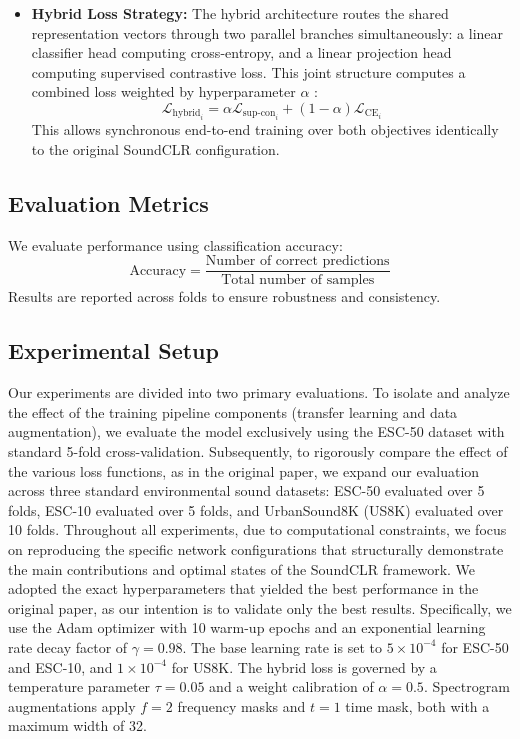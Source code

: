 \documentclass[twocolumn, 10pt]{article}
\begin{document}
\begin{itemize}
    \item \textbf{Hybrid Loss Strategy:} The hybrid architecture routes the shared representation vectors through two parallel branches simultaneously: a linear classifier head computing cross-entropy, and a linear projection head computing supervised contrastive loss. This joint structure computes a combined loss weighted by hyperparameter $\alpha$ \cite[Sec. III-C]{soundclr}:
    \begin{equation}
        \mathcal{L}_{\text{hybrid}_i} = \alpha \mathcal{L}_{\text{sup-con}_i} + (1 - \alpha) \mathcal{L}_{\text{CE}_i}
    \end{equation}
    This allows synchronous end-to-end training over both objectives identically to the original SoundCLR configuration.
\end{itemize}

\subsection{Evaluation Metrics}
We evaluate performance using classification accuracy:
\begin{equation}
\text{Accuracy} = \frac{\text{Number of correct predictions}}{\text{Total number of samples}}
\end{equation}
Results are reported across folds to ensure robustness and consistency.

\subsection{Experimental Setup}
Our experiments are divided into two primary evaluations. To isolate and analyze the effect of the training pipeline components (transfer learning and data augmentation), we evaluate the model exclusively using the ESC-50 dataset with standard 5-fold cross-validation. Subsequently, to rigorously compare the effect of the various loss functions, as in the original paper, we expand our evaluation across three standard environmental sound datasets: ESC-50 evaluated over 5 folds, ESC-10 evaluated over 5 folds, and UrbanSound8K (US8K) \cite{salamon2014dataset} evaluated over 10 folds. Throughout all experiments, due to computational constraints, we focus on reproducing the specific network configurations that structurally demonstrate the main contributions and optimal states of the SoundCLR framework. We adopted the exact hyperparameters that yielded the best performance in the original paper, as our intention is to validate only the best results. Specifically, we use the Adam optimizer with 10 warm-up epochs and an exponential learning rate decay factor of $\gamma=0.98$. The base learning rate is set to $5 \times 10^{-4}$ for ESC-50 and ESC-10, and $1 \times 10^{-4}$ for US8K. The hybrid loss is governed by a temperature parameter $\tau=0.05$ and a weight calibration of $\alpha=0.5$. Spectrogram augmentations apply $f=2$ frequency masks and $t=1$ time mask, both with a maximum width of 32.
\end{document}
